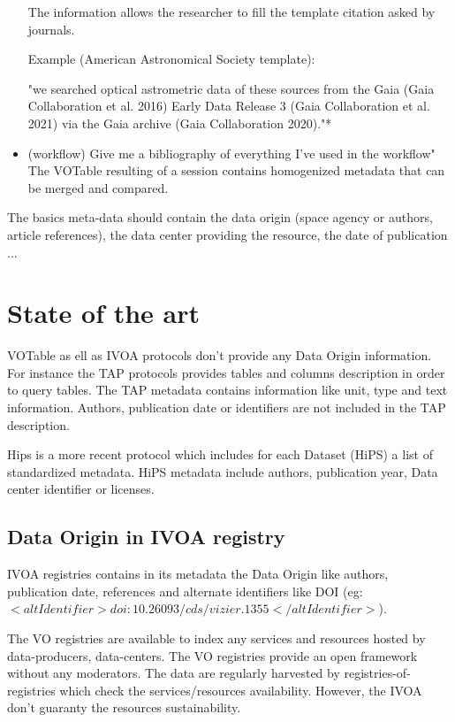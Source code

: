 \documentclass[11pt,a4paper]{ivoa}
\begin{document}
\begin{itemize}
	The information allows the researcher to fill the template citation asked by journals.
	
	Example (American Astronomical Society template):
	
	"we searched optical astrometric data of these sources from the Gaia (Gaia Collaboration et al. 2016) Early Data Release 3 (Gaia Collaboration et al. 2021) via the Gaia archive (Gaia Collaboration 2020)."*
	
	\item (workflow) Give me a bibliography of everything I've used in the workflow"
	The VOTable resulting of a session contains homogenized metadata that can be merged and compared.
	
\end{itemize}

The basics meta-data should contain the data origin (space agency or authors, article references), the data center providing the resource, the date of publication ...

\section{State of the art}

VOTable as ell as IVOA protocols don't provide any Data Origin information. For instance the TAP protocols provides tables and columns description in order to query tables. The TAP metadata contains information like unit, type and text information. Authors, publication date or identifiers are not included in the TAP description.

Hips is a more recent protocol which includes for each Dataset (HiPS) a list of standardized metadata. HiPS metadata include authors, publication year, Data center identifier or licenses.


\subsection{Data Origin in IVOA registry}
IVOA registries contains in its metadata the Data Origin like authors, publication date, references and alternate identifiers like DOI (eg: $<altIdentifier>doi:10.26093/cds/vizier.1355</altIdentifier>$).

The VO registries are available to index any services and resources hosted by data-producers, data-centers. 
The VO registries provide an open framework without any moderators. The data are regularly harvested by registries-of-registries which check the services/resources availability. However, the IVOA don't guaranty the resources sustainability.
\end{document}
